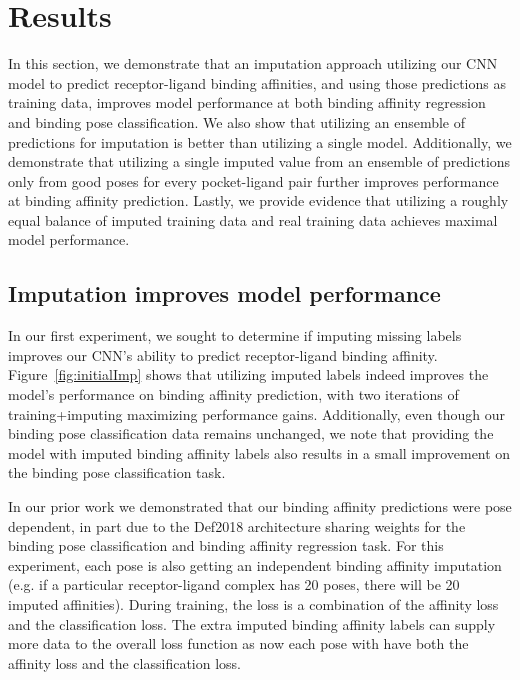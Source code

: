 \documentclass[journal=jmcmar,manuscript=article]{achemso}
\begin{document}

\section{Results}
In this section, we demonstrate that an imputation approach utilizing our CNN model to predict receptor-ligand binding affinities, and using those predictions as training data, improves model performance at both binding affinity regression and binding pose classification.
We also show that utilizing an ensemble of predictions for imputation is better than utilizing a single model.
Additionally, we demonstrate that utilizing a single imputed value from an ensemble of predictions only from good poses for every pocket-ligand pair further improves performance at binding affinity prediction.
Lastly, we provide evidence that utilizing a roughly equal balance of imputed training data and real training data achieves maximal model performance.

\subsection{Imputation improves model performance}
In our first experiment, we sought to determine if imputing missing labels improves our CNN's ability to predict receptor-ligand binding affinity.
Figure~\ref{fig:initialImp} shows that utilizing imputed labels indeed improves the model's performance on binding affinity prediction, with two iterations of training+imputing maximizing performance gains.
Additionally, even though our binding pose classification data remains unchanged, we note that providing the model with imputed binding affinity labels also results in a small improvement on the binding pose classification task.

In our prior work we demonstrated that our binding affinity predictions were pose dependent, in part due to the Def2018 architecture sharing weights for the binding pose classification and binding affinity regression task\cite{crossdocked2020}.
For this experiment, each pose is also getting an independent binding affinity imputation (e.g. if a particular receptor-ligand complex has 20 poses, there will be 20 imputed affinities).
During training, the loss is a combination of the affinity loss and the classification loss.
The extra imputed binding affinity labels can supply more data to the overall loss function as now each pose with have both the affinity loss and the classification loss.
\end{document}

